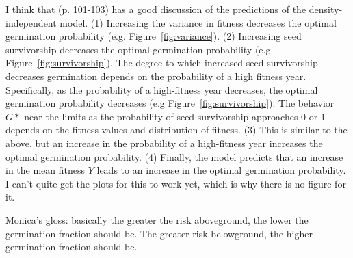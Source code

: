 \documentclass[12pt, oneside, titlepage]{article}   	%
\begin{document}
I think that \cite{ellner1985a} (p. 101-103) has a good discussion of the predictions of the density-independent model. (1) Increasing the variance in fitness decreases the optimal germination probability (e.g. Figure~\ref{fig:variance}). (2) Increasing seed survivorship decreases the optimal germination probability (e.g Figure~\ref{fig:survivorship}). The degree to which increased seed survivorship decreases germination depends on the probability of a high fitness year. Specifically, as the probability of a high-fitness year decreases, the optimal germination probability decreases (e.g Figure~\ref{fig:survivorship}). The behavior $G*$ near the limits as the probability of seed survivorship approaches 0 or 1 depends on the fitness values and distribution of fitness. (3) This is similar to the above, but an increase in the probability of a high-fitness year increases the optimal germination probability. (4) Finally, the model predicts that an increase in the mean fitness $Y$ leads to an increase in the optimal germination probability. I can't quite get the plots for this to work yet, which is why there is no figure for it. 

Monica's gloss: basically the greater the risk aboveground, the lower the germination fraction should be. The greater risk belowground, the higher germination fraction should be. 


\end{document}
